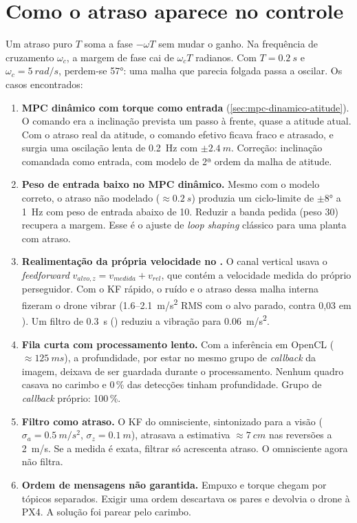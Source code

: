\section{Como o atraso aparece no controle}
Um atraso puro $T$ soma a fase $-\omega T$ sem mudar o ganho. Na frequência de cruzamento
$\omega_c$, a margem de fase cai de $\omega_c T$ radianos. Com $T=\SI{0,2}{s}$ e
$\omega_c=\SI{5}{rad/s}$, perdem-se \ang{57}: uma malha que parecia folgada passa a oscilar.
Os casos encontrados:

\begin{enumerate}
  \item \textbf{MPC dinâmico com torque como entrada} (\cref{sec:mpc-dinamico-atitude}).
        O comando era a inclinação prevista um passo à frente, quase a atitude atual. Com o
        atraso real da atitude, o comando efetivo ficava fraco e atrasado, e surgia uma
        oscilação lenta de \SI{0,2}{Hz} com $\pm\SI{2,4}{m}$. Correção: inclinação comandada
        como entrada, com modelo de 2ª ordem da malha de atitude.
  \item \textbf{Peso de entrada baixo no MPC dinâmico.} Mesmo com o modelo correto, o atraso
        não modelado ($\approx\SI{0,2}{s}$) produzia um ciclo-limite de $\pm\ang{8}$ a
        \SI{1}{Hz} com peso de entrada abaixo de 10. Reduzir a banda pedida (peso 30) recupera a
        margem. Esse é o ajuste de \emph{loop shaping} clássico para uma planta com atraso.
  \item \textbf{Realimentação da própria velocidade no .} O canal vertical
        usava o \emph{feedforward} $v_{alvo,z}=v_{medida}+v_{rel}$, que contém a velocidade
        medida do próprio perseguidor. Com o KF rápido, o ruído e o atraso dessa malha interna
        fizeram o drone vibrar (\SI{1,6}{}--\SI{2,1}{m/s^2} RMS com o alvo parado, contra 0,03
        em ). Um filtro de \SI{0,3}{s} () reduziu
        a vibração para \SI{0,06}{m/s^2}.
  \item \textbf{Fila curta com processamento lento.} Com a inferência em OpenCL
        ($\approx\SI{125}{ms}$), a profundidade, por estar no mesmo grupo de \emph{callback} da
        imagem, deixava de ser guardada durante o processamento. Nenhum quadro casava no
        carimbo e 0\,\% das detecções tinham profundidade. Grupo de \emph{callback} próprio:
        100\,\%.
  \item \textbf{Filtro como atraso.} O KF do omnisciente, sintonizado para a visão
        ($\sigma_a=\SI{0,5}{m/s^2}$, $\sigma_z=\SI{0,1}{m}$), atrasava a estimativa
        $\approx\SI{7}{cm}$ nas reversões a \SI{2}{m/s}. Se a medida é exata, filtrar só
        acrescenta atraso. O omnisciente agora não filtra.
  \item \textbf{Ordem de mensagens não garantida.} Empuxo e torque chegam por tópicos
        separados. Exigir uma ordem descartava os pares e devolvia o drone à PX4. A solução
        foi parear pelo carimbo.
\end{enumerate}

